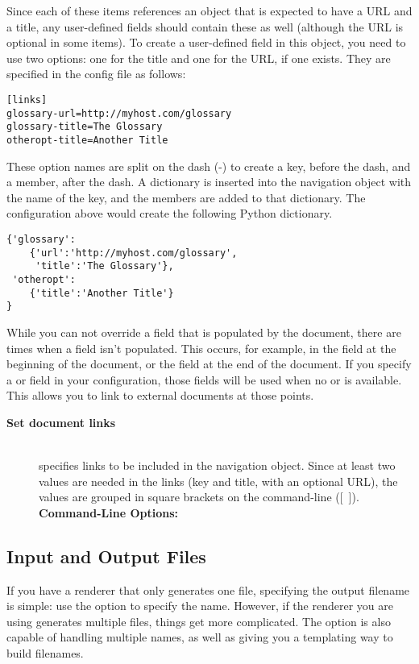 \documentclass{manual}
\newcommand{\optval}[1]{\textrm{\textit{#1}}}
\newenvironment{configuration}[1]{%
    \newcommand{\default}[1]{\hfill\\\textbf{Default:} ##1}%
    \newcommand{\config}[2]{\hfill\\\textbf{Config File:} [ ##1 ] ##2}%
    \newcommand{\options}[1]{\hfill\\\textbf{Command-Line Options:} %
                                     \texttt{##1}}%
    \begin{description}
    \item[\textbf{#1}] \hfill\\
}{\end{description}}
\begin{document}
Since each of these items references an object that is expected to have
a URL and a title, any user-defined fields should contain these as well
(although the URL is optional in some items).  To create a user-defined
field in this object, you need to use two options: one for the title
and one for the URL, if one exists.  They are specified in the config
file as follows:
\begin{verbatim}
[links]
glossary-url=http://myhost.com/glossary
glossary-title=The Glossary
otheropt-title=Another Title
\end{verbatim}

These option names are split on the dash (-) to create a key, before the dash,
and a member, after the dash.  A dictionary is inserted into the navigation
object with the name of the key, and the members are added to that dictionary.
The configuration above would create the following Python dictionary.
\begin{verbatim}
{'glossary':
    {'url':'http://myhost.com/glossary', 
     'title':'The Glossary'},
 'otheropt':
    {'title':'Another Title'}
}
\end{verbatim}

While you can not override a field that is populated by the document, 
there are times when a field isn't populated.  This occurs, for example,
in the  field at the beginning of the document, or the 
 field at the end of the document.  If you specify a 
or  field in your configuration, those fields will be used
when no  or  is available.  This allows you to link
to external documents at those points.


\begin{configuration}{Set document links}
specifies links to be included in the navigation object.  Since at
least two values are needed in the links (key and title, with an optional
URL), the values are grouped in square brackets on the command-line ([~]).
\options{\longprogramopt{links=\optval{[ key optional-url title ]}}}
\end{configuration}


\subsection{Input and Output Files}

If you have a renderer that only generates one file, specifying the output
filename is simple: use the  option to specify
the name.  However, if the renderer you are using generates multiple
files, things get more complicated.  The  option
is also capable of handling multiple names, as well as giving you a
templating way to build filenames.
\end{document}
